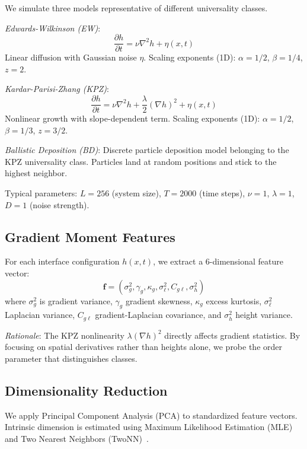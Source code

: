 \documentclass[aps,prl,twocolumn,superscriptaddress,showpacs]{revtex4-2}
\begin{document}
We simulate three models representative of different universality classes.

\emph{Edwards-Wilkinson (EW)}:
\begin{equation}
\frac{\partial h}{\partial t} = \nu \nabla^2 h + \eta(x,t)
\end{equation}
Linear diffusion with Gaussian noise $\eta$. Scaling exponents (1D): $\alpha = 1/2$, $\beta = 1/4$, $z = 2$.

\emph{Kardar-Parisi-Zhang (KPZ)}:
\begin{equation}
\frac{\partial h}{\partial t} = \nu \nabla^2 h + \frac{\lambda}{2}(\nabla h)^2 + \eta(x,t)
\end{equation}
Nonlinear growth with slope-dependent term. Scaling exponents (1D): $\alpha = 1/2$, $\beta = 1/3$, $z = 3/2$.

\emph{Ballistic Deposition (BD)}: Discrete particle deposition model belonging to the KPZ universality class. Particles land at random positions and stick to the highest neighbor.

Typical parameters: $L = 256$ (system size), $T = 2000$ (time steps), $\nu = 1$, $\lambda = 1$, $D = 1$ (noise strength).

\subsection{Gradient Moment Features}

For each interface configuration $h(x,t)$, we extract a 6-dimensional feature vector:
\begin{equation}
\mathbf{f} = (\sigma_g^2, \gamma_g, \kappa_g, \sigma_\ell^2, C_{g\ell}, \sigma_h^2)
\end{equation}
where $\sigma_g^2$ is gradient variance, $\gamma_g$ gradient skewness, $\kappa_g$ excess kurtosis, $\sigma_\ell^2$ Laplacian variance, $C_{g\ell}$ gradient-Laplacian covariance, and $\sigma_h^2$ height variance.

\emph{Rationale}: The KPZ nonlinearity $\lambda(\nabla h)^2$ directly affects gradient statistics. By focusing on spatial derivatives rather than heights alone, we probe the order parameter that distinguishes classes.

\subsection{Dimensionality Reduction}

We apply Principal Component Analysis (PCA) to standardized feature vectors. Intrinsic dimension is estimated using Maximum Likelihood Estimation (MLE)~\cite{Levina2004} and Two Nearest Neighbors (TwoNN)~\cite{Facco2017}.
\end{document}
